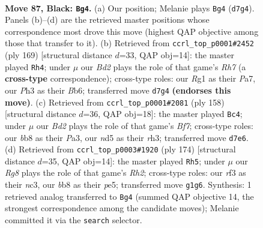 \documentclass[11pt]{article}
\begin{document}
\clearpage

\begin{figure}[p]\centering
\begin{subfigure}{0.46\textwidth}\centering
\resizebox{\linewidth}{!}{%
\newchessgame
\chessboard[
  setfen={1B6/3b2k1/8/1P1N4/P3B3/3K1R1p/8/6r1 b - - 14 87},
  showmover=false,
  pgfstyle=straightmove, color=movearrow, markmove={d7-g4}
]}
\caption{}
\end{subfigure}\hfill
\begin{subfigure}{0.46\textwidth}\centering
\resizebox{\linewidth}{!}{%
\newchessgame
\chessboard[
  setfen={4B3/p2K3k/1b1R4/7P/8/8/7r/8 b - - 49 85},
  showmover=false,
  pgfstyle=straightmove, color=movearrow, markmove={h2-h4}
]}
\caption{}
\end{subfigure}
\\[4pt]
\begin{subfigure}{0.46\textwidth}\centering
\resizebox{\linewidth}{!}{%
\newchessgame
\chessboard[
  setfen={2k5/R4B1p/6p1/4Bb2/p7/P6r/5K2/8 w - - 11 80},
  showmover=false,
  pgfstyle=straightmove, color=movearrow, markmove={f7-c4}
]}
\caption{}
\end{subfigure}\hfill
\begin{subfigure}{0.46\textwidth}\centering
\resizebox{\linewidth}{!}{%
\newchessgame
\chessboard[
  setfen={8/8/2B5/4p3/3bP1K1/2n1k3/7R/8 w - - 39 88},
  showmover=false,
  pgfstyle=straightmove, color=movearrow, markmove={h2-h5}
]}
\caption{}
\end{subfigure}
\caption{\textbf{Move 87, Black: \texttt{Bg4}.} (a) Our position; Melanie plays \texttt{Bg4} (\texttt{d7g4}). Panels (b)--(d) are the retrieved master positions whose correspondence most drove this move (highest QAP objective among those that transfer to it). (b) Retrieved from \texttt{ccrl\_top\_p0001\#2452} (ply 169) [structural distance $d$=33, QAP obj=14]: the master played \texttt{Rh4}; under $\mu$ our \emph{Bd2} plays the role of that game's \emph{Rh7} (a \textbf{cross-type} correspondence); cross-type roles: our \emph{R}g1 as their \emph{P}a7, our \emph{P}h3 as their \emph{B}b6; transferred move \texttt{d7g4} \textbf{(endorses this move)}. (c) Retrieved from \texttt{ccrl\_top\_p0001\#2081} (ply 158) [structural distance $d$=36, QAP obj=18]: the master played \texttt{Bc4}; under $\mu$ our \emph{Bd2} plays the role of that game's \emph{Bf7}; cross-type roles: our \emph{b}b8 as their \emph{P}a3, our \emph{n}d5 as their \emph{r}h3; transferred move \texttt{d7e6}. (d) Retrieved from \texttt{ccrl\_top\_p0003\#1920} (ply 174) [structural distance $d$=35, QAP obj=14]: the master played \texttt{Rh5}; under $\mu$ our \emph{Rg8} plays the role of that game's \emph{Rh2}; cross-type roles: our \emph{r}f3 as their \emph{n}c3, our \emph{b}b8 as their \emph{p}e5; transferred move \texttt{g1g6}. Synthesis: 1 retrieved analog transferred to \texttt{Bg4} (summed QAP objective 14, the strongest correspondence among the candidate moves); Melanie committed it via the \texttt{search} selector.}
\label{fig:thought-m173}
\end{figure}
\end{document}
